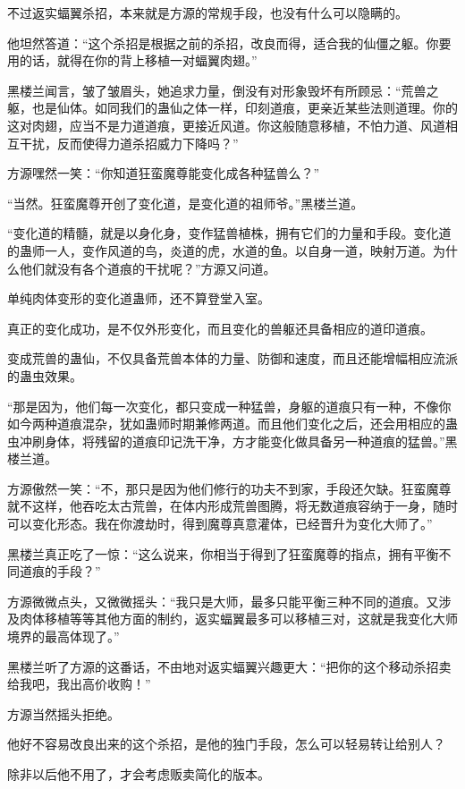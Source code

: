 \begin{this_body}
不过返实蝠翼杀招，本来就是方源的常规手段，也没有什么可以隐瞒的。

他坦然答道：“这个杀招是根据之前的杀招，改良而得，适合我的仙僵之躯。你要用的话，就得在你的背上移植一对蝠翼肉翅。”

黑楼兰闻言，皱了皱眉头，她追求力量，倒没有对形象毁坏有所顾忌：“荒兽之躯，也是仙体。如同我们的蛊仙之体一样，印刻道痕，更亲近某些法则道理。你的这对肉翅，应当不是力道道痕，更接近风道。你这般随意移植，不怕力道、风道相互干扰，反而使得力道杀招威力下降吗？”

方源嘿然一笑：“你知道狂蛮魔尊能变化成各种猛兽么？”

“当然。狂蛮魔尊开创了变化道，是变化道的祖师爷。”黑楼兰道。

“变化道的精髓，就是以身化身，变作猛兽植株，拥有它们的力量和手段。变化道的蛊师一人，变作风道的鸟，炎道的虎，水道的鱼。以自身一道，映射万道。为什么他们就没有各个道痕的干扰呢？”方源又问道。

单纯肉体变形的变化道蛊师，还不算登堂入室。

真正的变化成功，是不仅外形变化，而且变化的兽躯还具备相应的道印道痕。

变成荒兽的蛊仙，不仅具备荒兽本体的力量、防御和速度，而且还能增幅相应流派的蛊虫效果。

“那是因为，他们每一次变化，都只变成一种猛兽，身躯的道痕只有一种，不像你如今两种道痕混杂，犹如蛊师时期兼修两道。而且他们变化之后，还会用相应的蛊虫冲刷身体，将残留的道痕印记洗干净，方才能变化做具备另一种道痕的猛兽。”黑楼兰道。

方源傲然一笑：“不，那只是因为他们修行的功夫不到家，手段还欠缺。狂蛮魔尊就不这样，他吞吃太古荒兽，在体内形成荒兽图腾，将无数道痕容纳于一身，随时可以变化形态。我在你渡劫时，得到魔尊真意灌体，已经晋升为变化大师了。”

黑楼兰真正吃了一惊：“这么说来，你相当于得到了狂蛮魔尊的指点，拥有平衡不同道痕的手段？”

方源微微点头，又微微摇头：“我只是大师，最多只能平衡三种不同的道痕。又涉及肉体移植等等其他方面的制约，返实蝠翼最多可以移植三对，这就是我变化大师境界的最高体现了。”

黑楼兰听了方源的这番话，不由地对返实蝠翼兴趣更大：“把你的这个移动杀招卖给我吧，我出高价收购！”

方源当然摇头拒绝。

他好不容易改良出来的这个杀招，是他的独门手段，怎么可以轻易转让给别人？

除非以后他不用了，才会考虑贩卖简化的版本。


\end{this_body}
